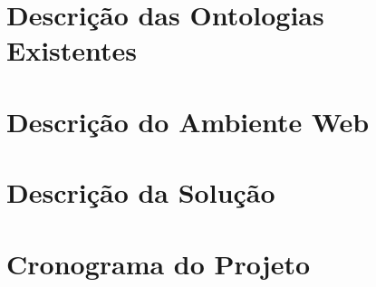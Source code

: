 % 

\section{Descrição das Ontologias Existentes} %
\label{sec:introdu_o}
 

\section{Descrição do Ambiente Web} %
\label{sec:introdu_o}
 

\section{Descrição da Solução} %
\label{sec:solucao}
 

\section{Cronograma do Projeto} %
\label{sec:produtos}
 
